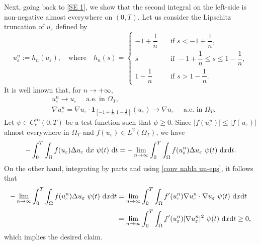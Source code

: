 \documentclass[11pt,  reqno]{amsart}%
\theoremstyle{plain}
\theoremstyle{definition}
\theoremstyle{remark}
\numberwithin{equation}{section}
\newcommand{\ve}{\varepsilon}
\newcommand{\dx}{\textup{d}x}
\newcommand{\dt}{\textup{d}t}
\begin{document}
Next, going back to \eqref{SE 1}, we show that the second integral on the left-side is non-negative almost everywhere on $(0,T)$. Let us consider the Lipschitz truncation of $u_\ve$ defined by 
\begin{equation}
\label{trunc}
u_\ve^n := h_n(u_\ve), \quad \mbox{where} \quad h_n(s)=\begin{cases}
        -1+\dfrac{1}{n} \quad &\mbox{if }s< -1+\dfrac{1}{n},\\[3pt]
        s&\mbox{if } -1+\dfrac{1}{n}\le s \le 1-\dfrac{1}{n},\\[3pt]
        1-\dfrac{1}{n} \quad &\mbox{if }s> 1-\dfrac{1}{n}.
    \end{cases}
\end{equation}
It is well known that, for $n \to + \infty$,
\begin{align}
    &u_\ve^n \to u_\ve \quad \mbox{ a.e. in }\Omega_T, \label{conv un-eps}\\[3pt]
    &\nabla u_\ve^n = \nabla u_\ve \cdot \mathbf{1}_{\left[ -1+\frac{1}{n},1-\frac{1}{n}\right]}(u_\ve) \to \nabla u_\ve \quad \mbox{ a.e. in }\Omega_T.\label{conv nabla un-eps}
\end{align}
Let $\psi \in C^\infty_c(0,T)$ be a test function such that $\psi \geq 0$. Since $|f(u_\ve^n)| \leq |f(u_\ve)|$ almost everywhere in $\Omega_T$ and $f(u_\ve) \in L^2(\Omega_T)$, we have 
\begin{align*}
- \int_0^T \int_\Omega f(u_\ve) \Delta u_\ve \  \dx \ \psi(t) \ \dt
=- \lim_{n \to \infty} \int_0^T \int_\Omega f(u_\ve^n) \Delta u_\ve \ \psi(t) \ \dx  \dt.
\end{align*}
On the other hand, integrating by parts and using \eqref{conv nabla un-eps}, it follows that
\begin{align}
- \lim_{n \to \infty} \int_0^T  \int_\Omega f(u_\ve^n) \Delta u_\ve \ \psi(t) \ \dx\dt
&=\lim_{n \to \infty}  \int_0^T \int_\Omega f'(u_\ve^n) \nabla u_\ve^n \cdot \nabla u_\ve \ \psi(t) \ \dx \dt
\notag
\\[3pt]
& =\lim_{n \to \infty}  \int_0^T  \int_\Omega f'(u_\ve^n) |\nabla u_\ve^n|^2 \  \psi(t) \ \dx \dt \geq 0,
\label{f'-pos}
\end{align}
which implies the desired claim.
\end{document}
